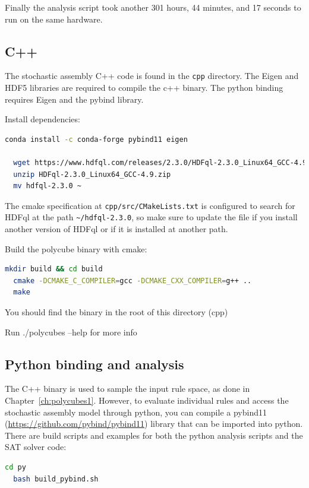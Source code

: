 Finally the analysis script took another 301 hours, 44 minutes, and 17 seconds to run on the same hardware.


\subsection{C++}
The stochastic assembly C++ code is found in the \texttt{cpp} directory. The Eigen and HDF5 libraries are required to compile the c++ binary. The python binding requires Eigen and the pybind library.

Install dependencies:
\begin{lstlisting}[language=bash]
  conda install -c conda-forge pybind11 eigen

  wget https://www.hdfql.com/releases/2.3.0/HDFql-2.3.0_Linux64_GCC-4.9.zip
  unzip HDFql-2.3.0_Linux64_GCC-4.9.zip
  mv hdfql-2.3.0 ~
\end{lstlisting}

The cmake specification at \texttt{cpp/src/CMakeLists.txt} is configured to search for HDFql at the path \texttt{\textasciitilde/hdfql-2.3.0}, so make sure to update the file if you install another version of HDFql or if it is installed at another path.

Build the polycube binary with cmake:
\begin{lstlisting}[language=bash]
  mkdir build && cd build
  cmake -DCMAKE_C_COMPILER=gcc -DCMAKE_CXX_COMPILER=g++ ..
  make
\end{lstlisting}

You should find the binary in the root of this directory (cpp)

Run ./polycubes --help for more info

\subsection{Python binding and analysis}
The C++ binary is used to sample the input rule space, as done in Chapter~\ref{ch:polycubes1}. However, to evaluate individual rules and access the stochastic assembly model through python, you can compile a pybind11 (\url{https://github.com/pybind/pybind11}) library that can be imported into python. There are build scripts and examples for both the python analysis scripts and the SAT solver code:

\begin{lstlisting}[language=bash]
  cd py
  bash build_pybind.sh
\end{lstlisting}

